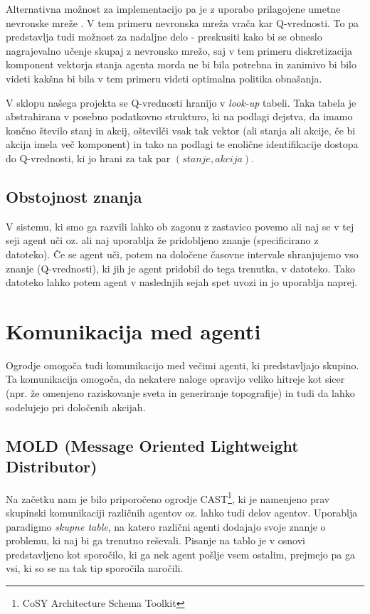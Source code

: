 \documentclass[a4paper,10pt]{article}
\begin{document}
Alternativna možnost za implementacijo pa je z uporabo prilagojene umetne nevronske mreže \cite{ql}. V tem primeru nevronska mreža vrača kar Q-vrednosti. To pa predstavlja tudi možnost za nadaljne delo - preskusiti kako bi se obneslo nagrajevalno učenje skupaj z nevronsko mrežo, saj v tem primeru diskretizacija komponent vektorja stanja agenta morda ne bi bila potrebna in zanimivo bi bilo videti kakšna bi bila v tem primeru videti optimalna politika obnašanja.

V sklopu našega projekta se Q-vrednosti hranijo v \textit{look-up} tabeli. Taka tabela je abstrahirana v posebno podatkovno strukturo, ki na podlagi dejstva, da imamo končno število stanj in akcij, oštevilči vsak tak vektor (ali stanja ali akcije, če bi akcija imela več komponent) in tako na podlagi te enolične identifikacije dostopa do Q-vrednosti, ki jo hrani za tak par $(stanje, akcija)$.

\subsection{Obstojnost znanja}

V sistemu, ki smo ga razvili lahko ob zagonu z zastavico povemo ali naj se v tej seji agent uči oz. ali naj uporablja že pridobljeno znanje (specificirano z datoteko). Če se agent uči, potem na določene časovne intervale shranjujemo vso znanje (Q-vrednosti), ki jih je agent pridobil do tega trenutka, v datoteko. Tako datoteko lahko potem agent v naslednjih sejah spet uvozi in jo uporablja naprej.

\section{Komunikacija med agenti}

Ogrodje omogoča tudi komunikacijo med večimi agenti, ki predstavljajo skupino. Ta komunikacija omogoča, da nekatere naloge opravijo veliko hitreje kot sicer (npr. že omenjeno raziskovanje sveta in generiranje topografije) in tudi da lahko sodelujejo pri določenih akcijah.

\subsection{MOLD (Message Oriented Lightweight Distributor)}

Na začetku nam je bilo priporočeno ogrodje CAST\footnote{CoSY Architecture Schema Toolkit}, ki je namenjeno prav skupinski komunikaciji različnih agentov oz. lahko tudi delov agentov. Uporablja paradigmo \textit{skupne table}, na katero različni agenti dodajajo svoje znanje o problemu, ki naj bi ga trenutno reševali. Pisanje na tablo je v osnovi predstavljeno kot sporočilo, ki ga nek agent pošlje vsem ostalim, prejmejo pa ga vsi, ki so se na tak tip sporočila naročili.
\end{document}

